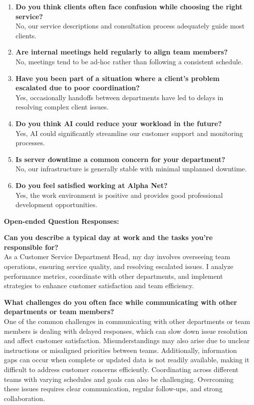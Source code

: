 \begin{enumerate}
    \item \textbf{Do you think clients often face confusion while choosing the right service?}\\
    No, our service descriptions and consultation process adequately guide most clients.
    
    \item \textbf{Are internal meetings held regularly to align team members?}\\
    No, meetings tend to be ad-hoc rather than following a consistent schedule.
    
    \item \textbf{Have you been part of a situation where a client's problem escalated due to poor coordination?}\\
    Yes, occasionally handoffs between departments have led to delays in resolving complex client issues.
    
    \item \textbf{Do you think AI could reduce your workload in the future?}\\
    Yes, AI could significantly streamline our customer support and monitoring processes.
    
    \item \textbf{Is server downtime a common concern for your department?}\\
    No, our infrastructure is generally stable with minimal unplanned downtime.
    
    \item \textbf{Do you feel satisfied working at Alpha Net?}\\
    Yes, the work environment is positive and provides good professional development opportunities.
\end{enumerate}

\textbf{Open-ended Question Responses:}

\textbf{Can you describe a typical day at work and the tasks you're responsible for?}\\
As a Customer Service Department Head, my day involves overseeing team operations, ensuring service quality, and resolving escalated issues. I analyze performance metrics, coordinate with other departments, and implement strategies to enhance customer satisfaction and team efficiency.

\textbf{What challenges do you often face while communicating with other departments or team members?}\\
One of the common challenges in communicating with other departments or team members is dealing with delayed responses, which can slow down issue resolution and affect customer satisfaction. Misunderstandings may also arise due to unclear instructions or misaligned priorities between teams. Additionally, information gaps can occur when complete or updated data is not readily available, making it difficult to address customer concerns efficiently. Coordinating across different teams with varying schedules and goals can also be challenging. Overcoming these issues requires clear communication, regular follow-ups, and strong collaboration.

